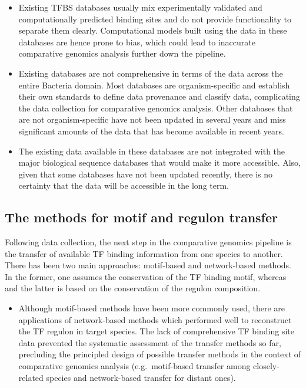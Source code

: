 \documentclass[12pt]{article}
\begin{document}
\begin{itemize}
\item Existing TFBS databases usually mix experimentally validated and
  computationally predicted binding sites and do not provide functionality to
  separate them clearly. Computational models built using the data in these
  databases are hence prone to bias, which could lead to inaccurate comparative
  genomics analysis further down the pipeline.

\item Existing databases are not comprehensive in terms of the data across the
  entire Bacteria domain. Most databases are organism-specific and establish
  their own standards to define data provenance and classify data, complicating
  the data collection for comparative genomics analysis. Other databases that
  are not organism-specific have not been updated in several years and miss
  significant amounts of the data that has become available in recent years.

\item The existing data available in these databases are not integrated with
  the major biological sequence databases that would make it more
  accessible. Also, given that some databases have not been updated recently,
  there is no certainty that the data will be accessible in the long term.
\end{itemize}

\subsection{The methods for motif and regulon transfer}
Following data collection, the next step in the comparative genomics pipeline
is the transfer of available TF binding information from one species to
another. There has been two main approaches: motif-based and network-based
methods. In the former, one assumes the conservation of the TF binding motif,
whereas and the latter is based on the conservation of the regulon composition.

\begin{itemize}
\item Although motif-based methods have been more commonly used, there are
  applications of network-based methods which performed well to reconstruct the
  TF regulon in target species. The lack of comprehensive TF binding site data
  prevented the systematic assessment of the transfer methods so far,
  precluding the principled design of possible transfer methods in the context
  of comparative genomics analysis (e.g.\ motif-based transfer among
  closely-related species and network-based transfer for distant ones).
\end{itemize}
\end{document}
